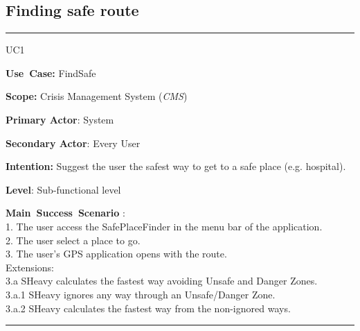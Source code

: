 \subsection{Finding safe route}
\vspace{0.5cm}
\hrule
\vspace{0.5cm}
\begin{lyxlist}{UC1}
\small{
\item [\textbf{Use~Case:}] FindSafe
\item [\textbf{Scope:}] Crisis Management System (\emph{CMS})
\item [\textbf{Primary Actor}:] System
\item [\textbf{Secondary Actor}:] Every User
\item [\textbf{Intention:}]Suggest the user the safest way to get to a safe
place (e.g. hospital).
\item [\textbf{Level}:]Sub-functional level
\item [\textbf{Main~Success~Scenario}]:\\
1. The user access the SafePlaceFinder in the menu bar of the application.\\
2. The user select a place to go.\\
3. The user's GPS application opens with the route.\\
Extensions:\\
3.a SHeavy calculates the fastest way avoiding Unsafe and Danger Zones.\\
	3.a.1 SHeavy ignores any way through an Unsafe/Danger Zone.\\
	3.a.2 SHeavy calculates the fastest way from the non-ignored ways.\\
\item 
}
\end{lyxlist}
\hrule
\vspace{0.5cm}  
















